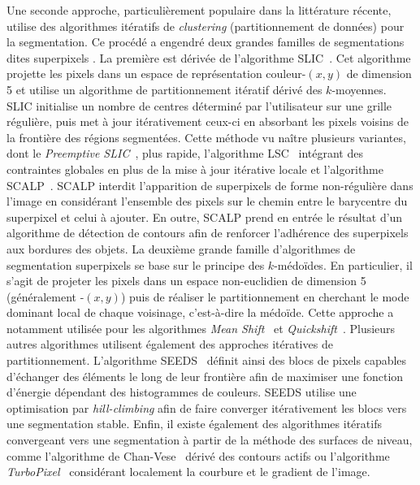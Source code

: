 Une seconde approche, particulièrement populaire dans la littérature récente, utilise des algorithmes itératifs de \emph{clustering} (partitionnement de données) pour la segmentation. Ce procédé a engendré deux grandes familles de segmentations dites \og superpixels \fg. La première est dérivée de l'algorithme \gls{SLIC}~\cite{achanta_slic_2010}. Cet algorithme projette les pixels dans un espace de représentation couleur-$(x,y)$ de dimension 5 et utilise un algorithme de partitionnement itératif dérivé des $k$-moyennes. \gls{SLIC} initialise un nombre de centres déterminé par l'utilisateur sur une grille régulière, puis met à jour itérativement ceux-ci en absorbant les pixels voisins de la frontière des régions segmentées. Cette méthode vu naître plusieurs variantes, dont le \emph{Preemptive SLIC}~\cite{neubert_compact_2014}, plus rapide, l'algorithme \gls{LSC}~\cite{li_superpixel_2015} intégrant des contraintes globales en plus de la mise à jour itérative locale et l'algorithme \gls{SCALP}~\cite{giraud_robust_2018}. \gls{SCALP} interdit l'apparition de superpixels de forme non-régulière dans l'image en considérant l'ensemble des pixels sur le chemin entre le barycentre du superpixel et celui à ajouter. En outre, \gls{SCALP} prend en entrée le résultat d'un algorithme de détection de contours afin de renforcer l'adhérence des superpixels aux bordures des objets.
La deuxième grande famille d'algorithmes de segmentation superpixels se base sur le principe des $k$-médoïdes. En particulier, il s'agit de projeter les pixels dans un espace non-euclidien de dimension 5 (généralement -$(x,y)$) puis de réaliser le partitionnement en cherchant le mode dominant local de chaque voisinage, c'est-à-dire la médoïde. Cette approche a notamment utilisée pour les algorithmes \emph{Mean Shift}~\cite{comaniciu_mean_2002} et \emph{Quickshift}~\cite{vedaldi_quick_2008}.
Plusieurs autres algorithmes utilisent également des approches itératives de partitionnement. L'algorithme \gls{SEEDS}~\cite{bergh_seeds_2012} définit ainsi des blocs de pixels capables d'échanger des éléments le long de leur frontière afin de maximiser une fonction d'énergie dépendant des histogrammes de couleurs. \gls{SEEDS} utilise une optimisation par \emph{hill-climbing} afin de faire converger itérativement les blocs vers une segmentation stable. Enfin, il existe également des algorithmes itératifs convergeant vers une segmentation à partir de la méthode des surfaces de niveau, comme l'algorithme de Chan-Vese~\cite{chan_active_1999} dérivé des contours actifs ou l'algorithme \emph{TurboPixel}~\cite{levinshtein_turbopixels_2009} considérant localement la courbure et le gradient de l'image.

